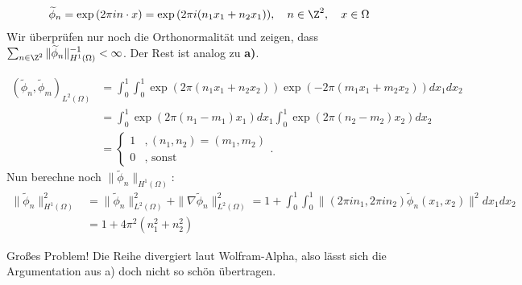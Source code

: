 \begin{solution}
\begin{enumerate}[label = \textbf{\alph*)}]
  \begin{align*}
    \widetilde{\phi}_n
    =
    \exp{(2 \pi i n \cdot x)}
    =
    \exp{(2 \pi i (n_1 x_1 + n_2 x_1))},
    \quad
    n \in \Z^2,
    \quad
    x \in \Omega
  \end{align*}
  Wir überprüfen nur noch die Orthonormalität und zeigen, dass
  $\sum_{n \in \Z^2}\|\widetilde{\phi}_n\|_{H^1(\Omega)}^{-1} < \infty$.
  Der Rest ist analog zu \textbf{a)}.

  \begin{align*}
    (\widetilde{\phi}_n, \widetilde{\phi}_m)_{L^2(\Omega)}
    &= \int_0^1\int_0^1\exp(2\pi(n_1x_1 + n_2x_2))\exp(-2\pi(m_1x_1 + m_2x_2)) dx_1 dx_2 \\
    &= \int_0^1\exp(2\pi(n_1 - m_1)x_1)dx_1 \int_0^1\exp(2\pi(n_2 - m_2)x_2)dx_2 \\
    &= \begin{cases}
      1 &, (n_1,n_2) = (m_1,m_2) \\
      0 &, \text{ sonst}
    \end{cases}.
  \end{align*}
  Nun berechne noch $\|\widetilde{\phi}_n\|_{H^1(\Omega)}$:
  \begin{align*}
    \|\widetilde{\phi}_n\|_{H^1(\Omega)}^2
    &= \|\widetilde{\phi}_n\|_{L^2(\Omega)}^2  + \|\nabla \widetilde{\phi}_n\|_{L^2(\Omega)}^2
    = 1 + \int_0^1\int_0^1 \|(2\pi in_1, 2\pi in_2)\widetilde{\phi}_n(x_1,x_2)\|^2 dx_1 dx_2 \\
    &= 1 + 4\pi^2(n_1^2 + n_2^2)
  \end{align*}

  Großes Problem! Die Reihe divergiert laut Wolfram-Alpha, also
  lässt sich die Argumentation aus a) doch nicht so schön übertragen.
\end{enumerate}

\end{solution}

